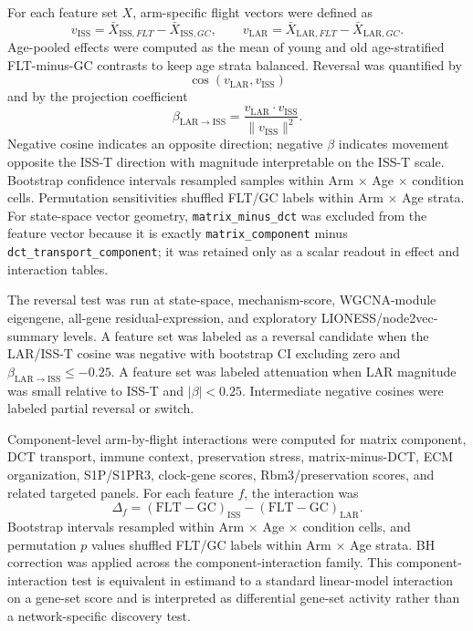 \documentclass[11pt]{article}
\newcommand{\code}[1]{\texttt{#1}}
\begin{document}
For each feature set $X$, arm-specific flight vectors were defined as
\begin{equation}
v_{\mathrm{ISS}}=\bar{X}_{\mathrm{ISS},FLT}-\bar{X}_{\mathrm{ISS},GC},
\qquad
v_{\mathrm{LAR}}=\bar{X}_{\mathrm{LAR},FLT}-\bar{X}_{\mathrm{LAR},GC}.
\end{equation}
Age-pooled effects were computed as the mean of young and old age-stratified FLT-minus-GC contrasts to keep age strata balanced. Reversal was quantified by
\begin{equation}
\cos(v_{\mathrm{LAR}},v_{\mathrm{ISS}})
\end{equation}
and by the projection coefficient
\begin{equation}
\beta_{\mathrm{LAR}\rightarrow \mathrm{ISS}}
=\frac{v_{\mathrm{LAR}}\cdot v_{\mathrm{ISS}}}{\lVert v_{\mathrm{ISS}}\rVert^2}.
\end{equation}
Negative cosine indicates an opposite direction; negative $\beta$ indicates movement opposite the ISS-T direction with magnitude interpretable on the ISS-T scale. Bootstrap confidence intervals resampled samples within Arm $\times$ Age $\times$ condition cells. Permutation sensitivities shuffled FLT/GC labels within Arm $\times$ Age strata. For state-space vector geometry, \code{matrix\_minus\_dct} was excluded from the feature vector because it is exactly \code{matrix\_component} minus \code{dct\_transport\_component}; it was retained only as a scalar readout in effect and interaction tables.

The reversal test was run at state-space, mechanism-score, WGCNA-module eigengene, all-gene residual-expression, and exploratory LIONESS/node2vec-summary levels. A feature set was labeled as a reversal candidate when the LAR/ISS-T cosine was negative with bootstrap CI excluding zero and $\beta_{\mathrm{LAR}\rightarrow \mathrm{ISS}}\leq -0.25$. A feature set was labeled attenuation when LAR magnitude was small relative to ISS-T and $|\beta|<0.25$. Intermediate negative cosines were labeled partial reversal or switch.

Component-level arm-by-flight interactions were computed for matrix component, DCT transport, immune context, preservation stress, matrix-minus-DCT, ECM organization, S1P/S1PR3, clock-gene scores, Rbm3/preservation scores, and related targeted panels. For each feature $f$, the interaction was
\begin{equation}
\Delta_f=(\mathrm{FLT}-\mathrm{GC})_{\mathrm{ISS}}-(\mathrm{FLT}-\mathrm{GC})_{\mathrm{LAR}}.
\end{equation}
Bootstrap intervals resampled within Arm $\times$ Age $\times$ condition cells, and permutation $p$ values shuffled FLT/GC labels within Arm $\times$ Age strata. BH correction was applied across the component-interaction family. This component-interaction test is equivalent in estimand to a standard linear-model interaction on a gene-set score and is interpreted as differential gene-set activity rather than a network-specific discovery test.
\end{document}
